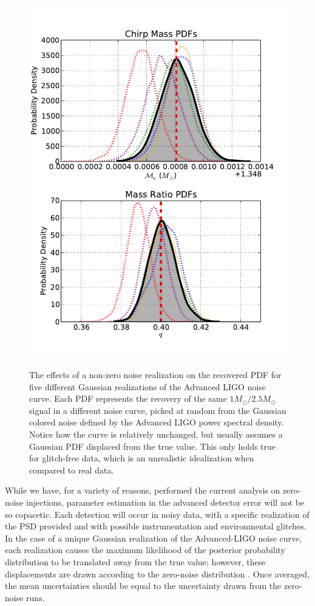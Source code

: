 \documentclass[11pt,a4paper]{emulateapj}
\begin{document}
\begin{figure}[ht!]
  \centering
 \includegraphics[trim=0cm 0cm 0cm 0cm, clip=true,scale=0.59]{noisePDF.pdf}
 \label{noisePDFs}
 \caption{The effects of a non-zero noise realization on the recovered PDF for five different Gaussian realizations of the Advanced LIGO noise curve.  Each PDF represents the recovery of the same $1M_{\odot}/2.5M_{\odot}$ signal in a different noise curve, picked at random from the Gaussian colored noise defined by the Advanced LIGO power spectral density.  Notice how the curve is relatively unchanged, but usually assumes a Gaussian PDF displaced from the true value.  This only holds true for glitch-free data, which is an unrealistic idealization when compared to real data.}
\end{figure}
  
  

While we have, for a variety of reasons, performed the current analysis on zero-noise injections,
parameter estimation in the advanced detector error will not be so copacetic. 
Each detection will occur in noisy data, with a specific realization of the PSD provided and with 
possible instrumentation and environmental glitches.  In the case of a unique Gaussian realization
of the Advanced-LIGO noise curve, each realization causes the maximum likelihood of the posterior probability 
distribution to be translated away from the true value; however, these displacements are drawn
according to the zero-noise distribution \citep{Inadequacies}.  Once averaged, the mean
uncertainties should be equal to the uncertainty drawn from the zero-noise runs.  
\end{document}
